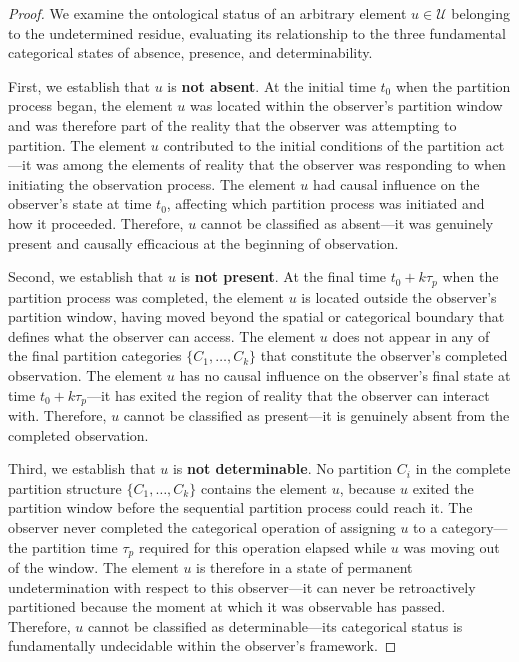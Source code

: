 \documentclass[12pt,a4paper]{article}
\theoremstyle{definition}
\theoremstyle{remark}
\begin{document}
\begin{proof}
We examine the ontological status of an arbitrary element $u \in \mathcal{U}$ belonging to the undetermined residue, evaluating its relationship to the three fundamental categorical states of absence, presence, and determinability.

First, we establish that $u$ is \textbf{not absent}. At the initial time $t_0$ when the partition process began, the element $u$ was located within the observer's partition window and was therefore part of the reality that the observer was attempting to partition. The element $u$ contributed to the initial conditions of the partition act—it was among the elements of reality that the observer was responding to when initiating the observation process. The element $u$ had causal influence on the observer's state at time $t_0$, affecting which partition process was initiated and how it proceeded. Therefore, $u$ cannot be classified as absent—it was genuinely present and causally efficacious at the beginning of observation.

Second, we establish that $u$ is \textbf{not present}. At the final time $t_0 + k\tau_p$ when the partition process was completed, the element $u$ is located outside the observer's partition window, having moved beyond the spatial or categorical boundary that defines what the observer can access. The element $u$ does not appear in any of the final partition categories $\{C_1, \ldots, C_k\}$ that constitute the observer's completed observation. The element $u$ has no causal influence on the observer's final state at time $t_0 + k\tau_p$—it has exited the region of reality that the observer can interact with. Therefore, $u$ cannot be classified as present—it is genuinely absent from the completed observation.

Third, we establish that $u$ is \textbf{not determinable}. No partition $C_i$ in the complete partition structure $\{C_1, \ldots, C_k\}$ contains the element $u$, because $u$ exited the partition window before the sequential partition process could reach it. The observer never completed the categorical operation of assigning $u$ to a category—the partition time $\tau_p$ required for this operation elapsed while $u$ was moving out of the window. The element $u$ is therefore in a state of permanent undetermination with respect to this observer—it can never be retroactively partitioned because the moment at which it was observable has passed. Therefore, $u$ cannot be classified as determinable—its categorical status is fundamentally undecidable within the observer's framework.


\end{proof}
\end{document}
